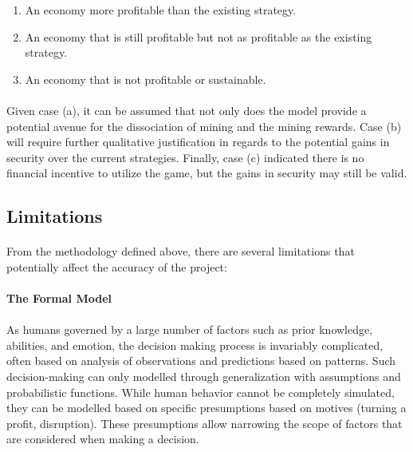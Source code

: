 \renewcommand{\labelenumi}{(\alph{enumi})}
\begin{enumerate}
  \item An economy more profitable than the existing strategy. 
  \item An economy that is still profitable but not as profitable as the existing strategy.
  \item An economy that is not profitable or sustainable. %
\end{enumerate}

\paragraph{} Given case (a), it can be assumed that not only does the model provide a potential avenue for the dissociation of mining and the mining rewards. Case (b) will require further qualitative justification in regards to the potential gains in security over the current strategies. Finally, case (c) indicated there is no financial incentive to utilize the game, but the gains in security may still be valid.

\subsection{Limitations}

\paragraph{} From the methodology defined above, there are several limitations that potentially affect the accuracy of the project:

\paragraph{The Formal Model}

\paragraph{} As humans governed by a large number of factors such as prior knowledge, abilities, and emotion, the decision making process is invariably complicated, often based on analysis of observations and predictions based on patterns. Such decision-making can only modelled through generalization with assumptions and probabilistic functions. While human behavior cannot be completely simulated, they can be modelled based on specific presumptions based on motives (turning a profit, disruption). These presumptions allow narrowing the scope of factors that are considered when making a decision.

